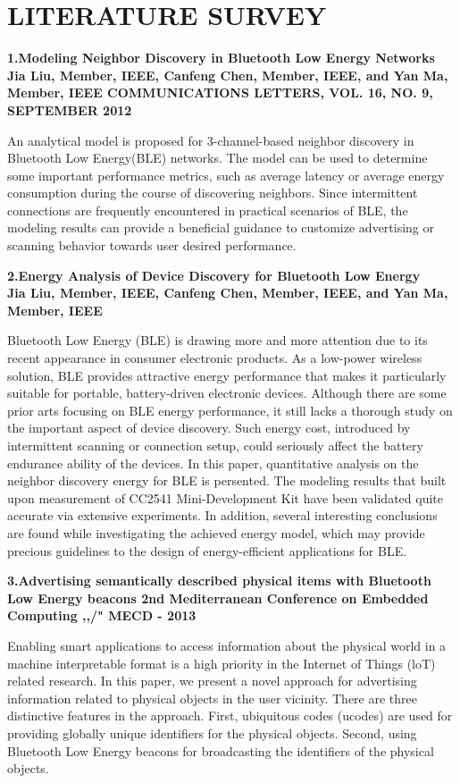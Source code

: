 \documentclass[12pt,a4paper]{report}
\begin{document}
\section{LITERATURE SURVEY}
\textbf{1.Modeling Neighbor Discovery in Bluetooth Low Energy Networks\\ Jia Liu, Member, IEEE, Canfeng Chen, Member, IEEE, and Yan Ma, Member, IEEE COMMUNICATIONS LETTERS, VOL. 16, NO. 9, SEPTEMBER 2012}

An analytical model is proposed for 3-channel-based neighbor discovery in Bluetooth Low Energy(BLE) networks. The model can be used to determine some important
performance metrics, such as average latency or average energy consumption during the course of discovering neighbors. Since intermittent connections are frequently encountered in practical scenarios of BLE, the modeling results can provide a
beneficial guidance to customize advertising or scanning behavior towards user desired performance.

\textbf{2.Energy Analysis of Device Discovery for Bluetooth Low Energy\\
    Jia Liu, Member, IEEE, Canfeng Chen, Member, IEEE, and Yan Ma, Member, IEEE
	}
	
	Bluetooth Low Energy (BLE) is drawing more and 	more attention due to its recent appearance in consumer 	electronic products. As a low-power wireless solution, BLE 	provides attractive energy performance that makes it 	particularly suitable for portable, battery-driven electronic devices. Although there are some prior arts focusing on BLE energy performance, it still lacks a thorough study on the important aspect of device discovery. Such energy cost,
	introduced by intermittent scanning or connection setup, could seriously affect the battery endurance ability of the devices. In this paper, quantitative analysis on the neighbor discovery energy for BLE is persented. The modeling results that built upon measurement of CC2541 Mini-Development Kit have been
	validated quite accurate via extensive experiments. In addition, several interesting conclusions are found while investigating the achieved energy model, which may provide precious guidelines to the design of energy-efficient applications for BLE.

\textbf{3.Advertising semantically described physical items with Bluetooth Low Energy beacons	2nd Mediterranean Conference on Embedded Computing ,,/" MECD - 2013}

Enabling smart applications to access information about the physical world in a machine interpretable format is a high priority in the Internet of Things (loT) related research. In this paper, we present a novel approach for advertising
information related to physical objects in the user vicinity. There are three distinctive features in the approach. First, ubiquitous codes (ucodes) are used for providing globally unique identifiers for the physical objects. Second, using Bluetooth Low Energy beacons for broadcasting the identifiers of the physical objects. 
\end{document}
